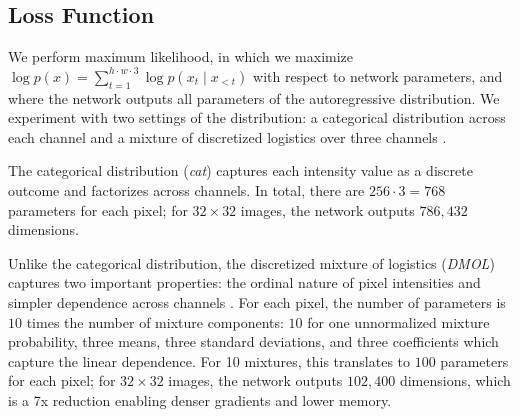 \subsection{Loss Function}
\label{sub:loss}

We perform maximum likelihood, in which we maximize $\log p(x) = \sum_{t=1}^{h\cdot w\cdot 3} \log p(x_t\mid x_{<t})$ with respect to network parameters, and where the
network outputs all parameters of the autoregressive distribution.
%
We experiment with two settings of the distribution: a categorical distribution across each channel \citep{PixelRNN} and a mixture of discretized logistics over three channels \citep{PixelCNNpp}.

The categorical distribution (\emph{cat}) captures each intensity value as a discrete outcome and factorizes across channels. In total, there are $256\cdot 3=768$ parameters for each pixel; for $32\times 32$ images, the network outputs $786,432$ dimensions.
%

Unlike the categorical distribution, the discretized mixture of logistics (\emph{DMOL}) captures two important properties: the ordinal nature of pixel intensities and simpler dependence across channels \citep{PixelCNNpp}.
For each pixel, the number of parameters is $10$ times the number of mixture components: $10$ for one unnormalized mixture probability, three means,
three standard deviations,
and three coefficients 
which capture the linear dependence.
For 10 mixtures, this translates to $100$ parameters for each pixel; for $32\times 32$ images, the network outputs $102,400$ dimensions, which is a 7x reduction enabling denser gradients and lower memory.
